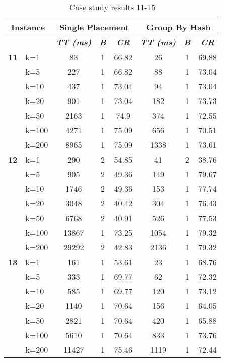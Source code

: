     \begin{table}[htbp]
    \caption{Case study results 11-15}
    \centering
    \begin{tabular}{|l|l|c|c|c|c|c|c|}
    \hline
    \multicolumn{ 2}{|c|}{\textbf{Instance}} & \multicolumn{ 3}{c|}{\textbf{Single Placement}} & \multicolumn{ 3}{c|}{\textbf{Group By Hash}} \\ \hline
    \multicolumn{ 2}{|l|}{} & \textbf{\textit{TT (ms)}} & \textbf{\textit{B}} & \textbf{\textit{CR}} & \textbf{\textit{TT (ms)}} & \textbf{\textit{B}} & \textbf{\textit{CR}} \\ \hline
    \multicolumn{1}{|r|}{\textbf{11}} & k=1 & 83 & 1 & 66.82 & 26 & 1 & 69.88 \\ 
     & k=5 & 227 & 1 & 66.82 & 88 & 1 & 73.04 \\ 
     & k=10 & 437 & 1 & 73.04 & 94 & 1 & 73.04 \\ 
     & k=20 & 901 & 1 & 73.04 & 182 & 1 & 73.73 \\ 
     & k=50 & 2163 & 1 & 74.9 & 374 & 1 & 72.55 \\ 
     & k=100 & 4271 & 1 & 75.09 & 656 & 1 & 70.51 \\ 
     & k=200 & 8965 & 1 & 75.09 & 1338 & 1 & 73.61 \\ \hline
    \multicolumn{1}{|r|}{\textbf{12}} & k=1 & 290 & 2 & 54.85 & 41 & 2 & 38.76 \\ 
     & k=5 & 905 & 2 & 49.36 & 149 & 1 & 79.67 \\ 
     & k=10 & 1746 & 2 & 49.36 & 153 & 1 & 77.74 \\ 
     & k=20 & 3048 & 2 & 40.42 & 304 & 1 & 76.43 \\ 
     & k=50 & 6768 & 2 & 40.91 & 526 & 1 & 77.53 \\ 
     & k=100 & 13867 & 1 & 73.25 & 1054 & 1 & 79.32 \\ 
     & k=200 & 29292 & 2 & 42.83 & 2136 & 1 & 79.32 \\ \hline
    \multicolumn{1}{|r|}{\textbf{13}} & k=1 & 161 & 1 & 53.61 & 23 & 1 & 68.76 \\ 
     & k=5 & 333 & 1 & 69.77 & 62 & 1 & 72.32 \\ 
     & k=10 & 585 & 1 & 69.77 & 120 & 1 & 73.12 \\ 
     & k=20 & 1140 & 1 & 70.64 & 156 & 1 & 64.05 \\ 
     & k=50 & 2821 & 1 & 70.64 & 420 & 1 & 65.88 \\ 
     & k=100 & 5610 & 1 & 70.64 & 833 & 1 & 73.76 \\ 
     & k=200 & 11427 & 1 & 75.46 & 1119 & 1 & 72.44 \\ \hline

\end{tabular}
\end{table}
